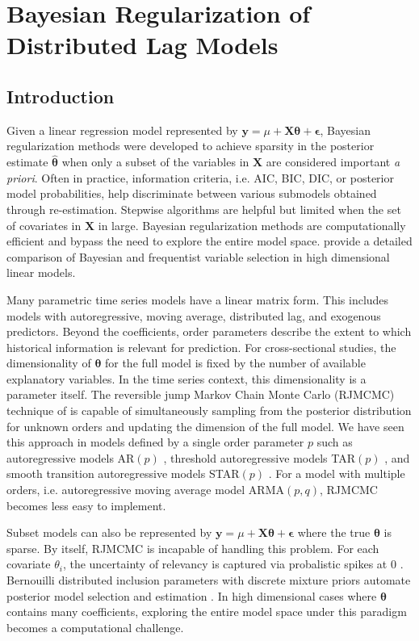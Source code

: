 \chapter{Bayesian Regularization of Distributed Lag Models}
\label{appendix3}
\newpage

\section{Introduction}
Given a linear regression model represented by $\bm{y}=\mu+\bm{X}\bm{\theta}+\bm{\epsilon}$,  Bayesian regularization methods were developed to achieve sparsity in the posterior estimate $\hat{\bm{\theta}}$ when only a subset of the variables in $\bm{X}$ are considered important \textit{a priori}. Often in practice, information criteria, i.e. AIC, BIC, DIC, or posterior model probabilities, help discriminate between various submodels obtained through re-estimation. Stepwise algorithms are helpful but limited when the set of covariates in $\bm{X}$ in large. Bayesian regularization methods are computationally efficient and bypass the need to explore the entire model space. \cite{Mallick2013} provide a detailed comparison of Bayesian and frequentist variable selection in high dimensional linear models.

Many parametric time series models have a linear matrix form. This includes models with autoregressive, moving average, distributed lag, and exogenous predictors. Beyond the coefficients, order parameters describe the extent to which historical information is relevant for prediction. For cross-sectional studies, the dimensionality of $\bm{\theta}$ for the full model is fixed by the number of available explanatory variables. In the time series context, this dimensionality is a parameter itself. The reversible jump Markov Chain Monte Carlo (RJMCMC) technique of \cite{Green1995} is capable of simultaneously sampling from the posterior distribution for unknown orders and updating the dimension of the full model. We have seen this approach in models defined by a single order parameter $p$ such as autoregressive models AR$(p)$ \citep{Troughton1997,Vermaak2004}, threshold autoregressive models TAR$(p)$ \citep{Campbell2004}, and smooth transition autoregressive models STAR$(p)$ \citep{Lopes2006}. For a model with multiple orders, i.e. autoregressive moving average model ARMA$(p,q)$, RJMCMC becomes less easy to implement.

Subset models can also be represented by $\bm{y}=\mu+\bm{X}\bm{\theta}+\bm{\epsilon}$ where the true $\bm{\theta}$ is sparse. By itself, RJMCMC is incapable of handling this problem. For each covariate $\theta_i$, the uncertainty of relevancy is captured via probalistic spikes at 0 \citep{Mitchell1988}. Bernouilli distributed inclusion parameters with discrete mixture priors automate posterior model selection and estimation \citep{George1993,Carlin1995,Kuo1998,Dellaportas2002}. In high dimensional cases where $\bm{\theta}$ contains many coefficients, exploring the entire model space under this paradigm becomes a computational challenge.

